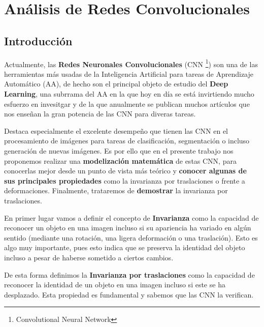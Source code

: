 

\chapter{Análisis de Redes Convolucionales}\label{ch:analisis}

\section{Introducción}

\noindent Actualmente, las \textbf{Redes Neuronales Convolucionales} (CNN \footnote{Convolutional Neural Network}) son una de las herramientas más usadas de la Inteligencia Artificial para tareas de Aprendizaje Automático (AA), de hecho son el principal objeto de estudio del \textbf{Deep Learning}, una subrrama del AA en la que hoy en día se está invirtiendo mucho esfuerzo en invesitgar y de la que anualmente se publican muchos artículos que nos enseñan la gran potencia de las CNN para diveras tareas.


\medskip

\noindent Destaca especialmente el excelente desempeño que tienen las CNN en el procesamiento de imágenes para tareas de clasificación, segmentación o incluso generación de nuevas imágenes. Es por ello que en el presente trabajo nos proponemos realizar una \textbf{modelización matemática} de estas CNN, para conocerlas mejor desde un punto de vista más teórico y \textbf{conocer algunas de sus principales propiedades} como la invarianza por traslaciones o frente a  deformaciones. Finalmente, trataremos de \textbf{demostrar} la invarianza por traslaciones.

\medskip

\noindent En primer lugar vamos a definir el concepto de \textbf{Invarianza} como la capacidad de reconocer un objeto en una imagen incluso si su apariencia ha variado en algún sentido (mediante una rotación, una  ligera deformación o una traslación). Esto es algo muy importante, pues esto indica que se preserva la identidad del objeto incluso a pesar de haberse sometido a ciertos cambios.

\medskip

\noindent De esta forma definimos la \textbf{Invarianza por traslaciones} como la capacidad de reconocer la identidad de un objeto en una imagen incluso si este se ha desplazado. Esta propiedad es fundamental y sabemos que las CNN la verifican.

